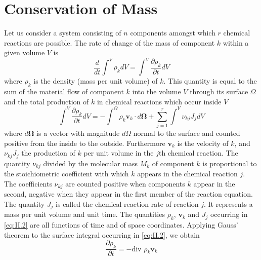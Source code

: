\section{Conservation of Mass}
Let us consider a system consisting of $n$ components amongst which $r$
chemical reactions are possible. The rate of change of the mass of component $k$ within a given volume $V$ is
\begin{equation}
\frac{d}{dt} \int^V \rho_k dV = \int^V \frac{\partial \rho_k}{\partial t} dV
    \label{eq:II.1}
\end{equation}
where $\rho_k$ is the density (mass per unit volume) of $k$. This quantity is equal to the sum of the material flow of component $k$ into the volume $V$ through its surface $\Omega$ and the total production of $k$ in chemical reactions which occur inside $V$
\begin{equation}
\int^V \frac{\partial \rho_k}{\partial t} dV = - \int^{\Omega} \rho_k \bm{v}_k \cdot d \bm{\Omega} + \sum_{j=1}^{r} \int^V \nu_{kj}J_j dV
    \label{eq:II.2}
\end{equation}
where $d \bm{\Omega}$ is a vector with magnitude $d \Omega$ normal to the surface and counted positive from the inside to the outside. Furthermore $\bm{v}_k$ is the velocity of $k$, and $\nu_{kj}J_j$ the production of $k$ per unit volume in the $j$th chemical reaction. The quantity $\nu_{kj}$ divided by the molecular mass $M_k$ of component $k$ is proportional to the stoichiometric coefficient with which $k$ appears in the chemical reaction $j$. The coefficients $\nu_{kj}$ are
counted positive when components $k$ appear in the second, negative
when they appear in the first member of the reaction equation. The
quantity $J_j$ is called the chemical reaction rate of reaction $j$. It represents a mass per unit volume and unit time. The quantities $\rho_k$, $\bm{v}_k$ and $J_j$ occurring in \eqref{eq:II.2} are all functions of time and of space coordinates. Applying Gauss' theorem to the surface integral occurring in \eqref{eq:II.2}, we obtain
\begin{equation}
\frac{\partial \rho_k}{\partial t} = - \textrm{div } \rho_k \bm{v}_k
    \label{eq:II.3}
\end{equation}

